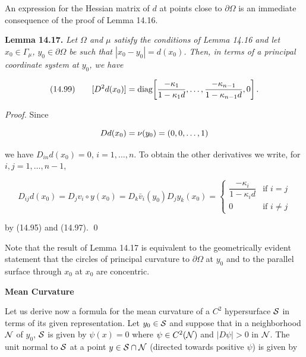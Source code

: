 An expression for the Hessian matrix of $d$ at points close to $\partial\Omega$ is an immediate consequence of the proof of Lemma 14.16.

\begin{lemma}\label{gt14-boundary-gradient-14-17}
\textbf{Lemma 14.17.} \textit{Let $\Omega$ and $\mu$ satisfy the conditions of Lemma 14.16 and let $x_0\in\Gamma_{\mu}$, $y_0\in\partial\Omega$ be such that $|x_0-y_0|=d(x_0)$. Then, in terms of a principal coordinate system at $y_0$, we have}

\begin{equation}
(14.99)\qquad [D^2d(x_0)]=\operatorname{diag}\!\left[\frac{-\kappa_1}{1-\kappa_1 d},\dots,\frac{-\kappa_{n-1}}{1-\kappa_{n-1} d},0\right].
\end{equation}

\textit{Proof.} Since

\[
Dd(x_0)=\nu(y_0)=(0,0,\dots,1)
\]


\pagestyle{empty}



we have $D_{in} d(x_0)=0$, $i=1,\ldots,n$. To obtain the other derivatives we write, for
$i,j=1,\ldots,n-1$,

\[
D_{ij}d(x_0)=D_j v_i\circ y(x_0)
=D_k \bar v_i(y_0)D_j y_k(x_0)
=
\begin{cases}
\dfrac{-\kappa_i}{1-\kappa_i d} & \text{if $i=j$}\\
0 & \text{if $i\neq j$}
\end{cases}
\]

by (14.95) and (14.97). \qed
\end{lemma}

Note that the result of Lemma 14.17 is equivalent to the geometrically evident
statement that the circles of principal curvature to $\partial\Omega$ at $y_0$ and to the parallel
surface through $x_0$ at $x_0$ are concentric.

\bigskip

\noindent\textbf{Mean Curvature}

\medskip

Let us derive now a formula for the mean curvature of a $C^2$ hypersurface $\mathcal{S}$ in
terms of its given representation. Let $y_0\in\mathcal{S}$ and suppose that in a neighborhood
$\mathcal{N}$ of $y_0$, $\mathcal{S}$ is given by $\psi(x)=0$ where $\psi\in C^2(\mathcal{N})$ and $|D\psi|>0$ in $\mathcal{N}$. The unit
normal to $\mathcal{S}$ at a point $y\in \mathcal{S}\cap\mathcal{N}$ (directed towards positive $\psi$) is given by

